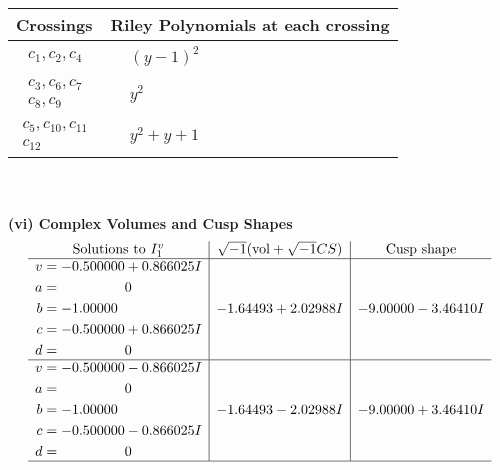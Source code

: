 \documentclass[1p]{elsarticle_modified}
\theoremstyle{definition}
\newcommand{\I}{\sqrt{-1}}
\begin{document}
\begin{tabular}{m{50pt}|m{274pt}}
Crossings & \hspace{64pt}Riley Polynomials at each crossing \\
\hline $$\begin{aligned}c_{1},c_{2},c_{4}\end{aligned}$$&$\begin{aligned}
&(y-1)^2
\end{aligned}$\\
\hline $$\begin{aligned}c_{3},c_{6},c_{7}\\c_{8},c_{9}\end{aligned}$$&$\begin{aligned}
&y^2
\end{aligned}$\\
\hline $$\begin{aligned}c_{5},c_{10},c_{11}\\c_{12}\end{aligned}$$&$\begin{aligned}
&y^2+y+1
\end{aligned}$\\
\hline
\end{tabular}\\~\\
\newpage\flushleft \textbf{(vi) Complex Volumes and Cusp Shapes}
$$\begin{array}{c|c|c}  
\text{Solutions to }I^v_{1}& \I (\text{vol} + \sqrt{-1}CS) & \text{Cusp shape}\\
 \hline 
\begin{aligned}
v &= -0.500000 + 0.866025 I \\
a &= \phantom{-0.000000 } 0 \\
b &= -1.00000\phantom{ +0.000000I} \\
c &= -0.500000 + 0.866025 I \\
d &= \phantom{-0.000000 } 0\end{aligned}
 & -1.64493 + 2.02988 I & -9.00000 - 3.46410 I \\ \hline\begin{aligned}
v &= -0.500000 - 0.866025 I \\
a &= \phantom{-0.000000 } 0 \\
b &= -1.00000\phantom{ +0.000000I} \\
c &= -0.500000 - 0.866025 I \\
d &= \phantom{-0.000000 } 0\end{aligned}
 & -1.64493 - 2.02988 I & -9.00000 + 3.46410 I\\
 \hline 
 \end{array}$$\newpage\newpage\renewcommand{\arraystretch}{1}
\end{document}
